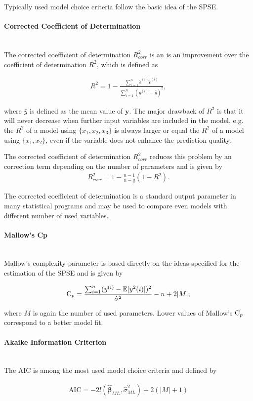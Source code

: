 \documentclass[10pt,a4paper]{article}
\newcommand{\subsubsubsection}[1]{\paragraph{#1}\mbox{}\\}
\begin{document}
Typically used model choice criteria follow the basic idea of the SPSE. \cite{fahrmeir2013regression}

\subsubsubsection{Corrected Coefficient of Determination}

The corrected coefficient of determination $R^2_{corr}$ is an is an improvement over the coefficient of determination $R^2$, which is defined as 

\begin{align}
	R^2 = 1 - \frac{\sum_{i=1}^n \hat \epsilon^{(i)} \hat \epsilon^{(i)}}{\sum_{i=1}^n (y^{(i)} - \bar y)^2},
\end{align}

where $\bar y$ is defined as the mean value of $\boldsymbol{y}$. The major drawback of $R^2$ is that it will never decrease when further input variables are included in the model, e.g. the $R^2$ of a model using $\{x_1, x_2, x_3\}$ is always larger or equal the $R^2$ of a model using $\{x_1, x_2\}$, even if the variable does not enhance the prediction quality. 

The corrected coefficient of determination $R_{corr}^2$ reduces this problem by an correction term depending on the  number of parameters and is given by
\begin{align}
	R_{corr}^2 = 1 - \frac{n-1}{n-q}(1-R^2).
\end{align}

The corrected coefficient of determination is a standard output parameter in many statistical programs and may be used to compare even models with different number of used variables. \cite{fahrmeir2013regression}

\subsubsubsection{Mallow's Cp}

Mallow's complexity parameter is based directly on the ideas specified for the estimation of the SPSE and is given by

\begin{align}
	\text C_p = \frac{\sum_{i=1}^n (y^{(i)} - \mathbb{E}[y^2{(i)}])^2}{\hat \sigma^2} - n + 2 \vert M \vert,
\end{align}

where $M$ is again the number of used parameters. Lower values of Mallow's $\text C_p$ correspond to a better model fit. \cite{fahrmeir2013regression}

\subsubsubsection{Akaike Information Criterion}

The AIC is among the most used model choice criteria and defined by

\begin{align}
	\text{AIC} = -2 l(\boldsymbol{\hat{\beta}}_{ML}, \hat \sigma^2_{ML}) + 2(\vert M \vert +1)
\end{align}
\end{document}
